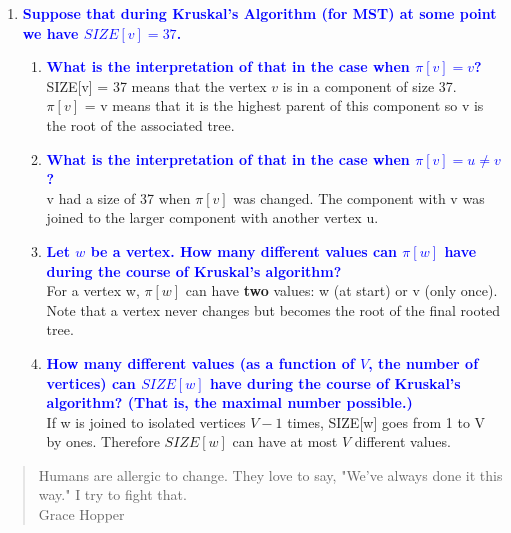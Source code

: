 \documentclass[11pt]{article}
\begin{document}
\begin{enumerate}
\item \textbf{\textcolor{blue}{Suppose that during Kruskal's Algorithm (for MST) at some point we have $SIZE[v]=37$.}}
\begin{enumerate}
    \item \textbf{\textcolor{blue}{What is the interpretation of that in the case when $\pi[v]=v$?}}
        \\ SIZE[v] = 37 means that the vertex $v$ is in a component of size 37.
        \\ $\pi[v]$ = v means that it is the highest parent of this component so v is the root of the associated tree. 
    \item \textbf{\textcolor{blue}{What is the interpretation of that in the case when $\pi[v]=u\neq v$?}}
        \\ v had a size of 37 when $\pi[v]$ was changed. The component with v was joined to the larger component with another vertex u.
    \item \textbf{\textcolor{blue}{Let $w$ be a vertex. How many different values can $\pi[w]$ have during the course of Kruskal's algorithm?}}
        \\ For a vertex w, $\pi[w]$ can have \textbf{two} values: w (at start) or v (only once).
        \\ Note that a vertex never changes but becomes the root of the final rooted tree.
    \item \textbf{\textcolor{blue}{How many different values (as a function of $V$, the number of vertices) can $SIZE[w]$ have during the course of Kruskal's algorithm? (That is, the maximal number possible.)}}
        \\ If w is joined to isolated vertices $V-1$ times, SIZE[w] goes from 1 to V by ones. Therefore $SIZE[w]$ can have at most $V$ different values.
\end{enumerate}
\end{enumerate}

\begin{quote}
Humans are allergic to change.  They love to say, "We've always done it this way."
I try to fight that.
\\ Grace Hopper
\end{quote}
\end{document}
